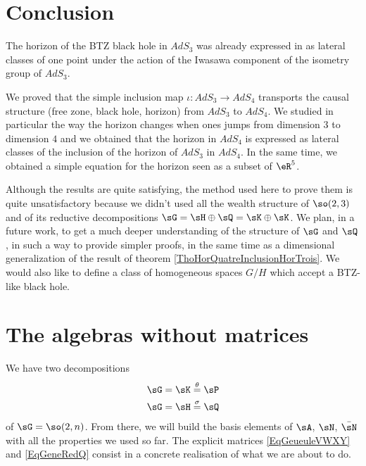 \section{Conclusion}

The horizon of the BTZ black hole in $AdS_3$ was already expressed in \cite{Keio} as lateral classes of one point under the action of the Iwasawa component of the isometry group of $AdS_3$.

We proved that the simple inclusion map $\iota\colon AdS_3\to AdS_4$ transports the causal structure (free zone, black hole, horizon) from $AdS_3$ to $AdS_4$. We studied in particular the way the horizon changes when ones jumps from dimension $3$ to dimension $4$ and we obtained that the horizon in $AdS_4$ is expressed as lateral classes of the inclusion of the horizon of $AdS_3$ in $AdS_4$. In the same time, we obtained a simple equation for the horizon seen as a subset of $\eR^5$.

Although the results are quite satisfying, the method used here to prove them is quite unsatisfactory because we didn't used all the wealth structure of $\so(2,3)$ and of its reductive decompositions $\sG=\sH\oplus\sQ=\sK\oplus\sK$. We plan, in a future work, to get a much deeper understanding of the structure of $\sG$ and $\sQ$, in such a way to provide simpler proofs, in the same time as a dimensional generalization of the result of theorem \ref{ThoHorQuatreInclusionHorTrois}. We would also like to define a class of homogeneous spaces $G/H$ which accept a BTZ-like black hole.
\section{The algebras without matrices}
\label{SecRebuildStructRoot}

We have two decompositions
\begin{equation}
	\begin{aligned}[]
		\sG&=\sK\stackrel{\theta}{=}\sP\\
		\sG&=\sH\stackrel{\sigma}{=}\sQ
	\end{aligned}
\end{equation}
of $\sG=\so(2,n)$. From there, we will build the basis elements of $\sA$, $\sN$, $\bar\sN$ with all the properties we used so far. The explicit matrices \eqref{EqGeueuleVWXY} and \eqref{EqGeneRedQ} consist in a concrete realisation of what we are about to do.

